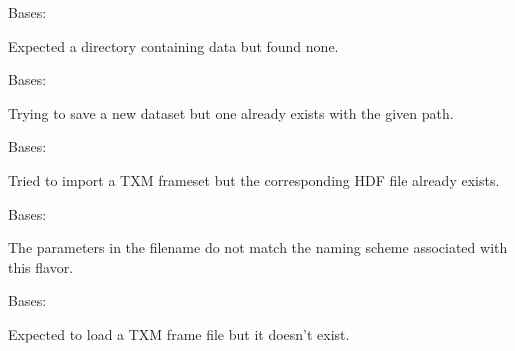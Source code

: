\documentclass[letterpaper,10pt,english]{sphinxmanual}
\begin{document}

\begin{fulllineitems}
\label{\detokenize{xanespy:xanespy.exceptions.DataNotFoundError}}
Bases: 

Expected a directory containing data but found none.

\end{fulllineitems}


\begin{fulllineitems}
\label{\detokenize{xanespy:xanespy.exceptions.DatasetExistsError}}
Bases: 

Trying to save a new dataset but one already exists with the given
path.

\end{fulllineitems}


\begin{fulllineitems}
\label{\detokenize{xanespy:xanespy.exceptions.FileExistsError}}
Bases: 

Tried to import a TXM frameset but the corresponding HDF file
already exists.

\end{fulllineitems}


\begin{fulllineitems}
\label{\detokenize{xanespy:xanespy.exceptions.FilenameParseError}}
Bases: 

The parameters in the filename do not match the naming scheme
associated with this flavor.

\end{fulllineitems}


\begin{fulllineitems}
\label{\detokenize{xanespy:xanespy.exceptions.FrameFileNotFound}}
Bases: 

Expected to load a TXM frame file but it doesn’t exist.

\end{fulllineitems}
\end{document}
